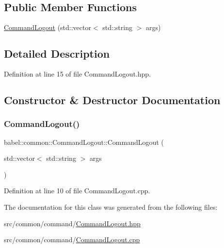 \subsection*{Public Member Functions}
\begin{DoxyCompactItemize}
\item 
\mbox{\hyperlink{classbabel_1_1common_1_1_command_logout_add4cd22efaafe462a02ece35d86b8250}{Command\+Logout}} (std\+::vector$<$ std\+::string $>$ args)
\end{DoxyCompactItemize}


\subsection{Detailed Description}


Definition at line 15 of file Command\+Logout.\+hpp.



\subsection{Constructor \& Destructor Documentation}
\mbox{\label{classbabel_1_1common_1_1_command_logout_add4cd22efaafe462a02ece35d86b8250}} 
\subsubsection{\texorpdfstring{Command\+Logout()}{CommandLogout()}}
{\footnotesize\ttfamily babel\+::common\+::\+Command\+Logout\+::\+Command\+Logout (\begin{DoxyParamCaption}\item[{std\+::vector$<$ std\+::string $>$}]{args }\end{DoxyParamCaption})}



Definition at line 10 of file Command\+Logout.\+cpp.



The documentation for this class was generated from the following files\+:\begin{DoxyCompactItemize}
\item 
src/common/command/\mbox{\hyperlink{_command_logout_8hpp}{Command\+Logout.\+hpp}}\item 
src/common/command/\mbox{\hyperlink{_command_logout_8cpp}{Command\+Logout.\+cpp}}\end{DoxyCompactItemize}
